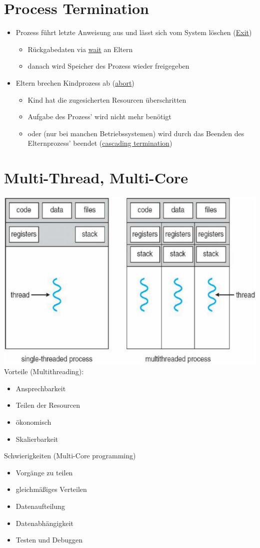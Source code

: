 \documentclass[a4paper]{scrreprt}
\begin{document}
\section{Process Termination}
	\begin{itemize}
		\item Prozess führt letzte Anweisung aus und lässt sich vom System löschen (\underline{Exit})
		\begin{itemize}
			\item Rückgabedaten via \underline{wait} an Eltern
			\item danach wird Speicher des Prozess wieder freigegeben
		\end{itemize}
		\item Eltern brechen Kindprozess ab (\underline{abort})
		\begin{itemize}
			\item Kind hat die zugesicherten Resourcen überschritten
			\item Aufgabe des Prozess' wird nicht mehr benötigt
			\item oder (nur bei manchen Betriebssystemen) wird durch das Beenden des Elternprozess' beendet (\underline{cascading termination})
		\end{itemize}
	\end{itemize}

\section{Multi-Thread, Multi-Core}
	\includegraphics[scale = 0.4]{graphics/threads.png}\\
	Vorteile (Multithreading):
	\begin{itemize}
		\item Ansprechbarkeit
		\item Teilen der Resourcen
		\item ökonomisch
		\item Skalierbarkeit
	\end{itemize}
	Schwierigkeiten (Multi-Core programming)
	\begin{itemize}
		\item Vorgänge zu teilen
		\item gleichmäßiges Verteilen
		\item Datenaufteilung
		\item Datenabhängigkeit
		\item Testen und Debuggen
	\end{itemize}
\end{document}
